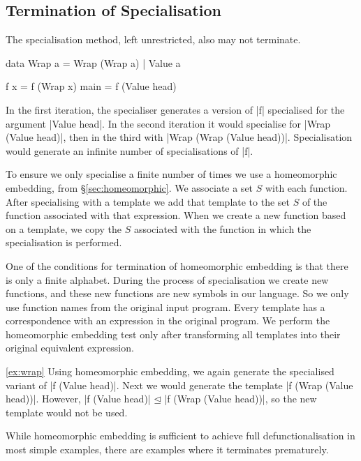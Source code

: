\subsection{Termination of Specialisation}
\label{sec:termination_specialisation}

The specialisation method, left unrestricted, also may not terminate.

\begin{example}
\label{ex:wrap}
\begin{code}
data Wrap a  =  Wrap (Wrap a)
             |  Value a

f x = f (Wrap x)
main = f (Value head)
\end{code}

In the first iteration, the specialiser generates a version of |f| specialised for the argument |Value head|. In the second iteration it would specialise for |Wrap (Value head)|, then in the third with |Wrap (Wrap (Value head))|. Specialisation would generate an infinite number of specialisations of |f|.
\end{example}

To ensure we only specialise a finite number of times we use a homeomorphic embedding, from \S\ref{sec:homeomorphic}. We associate a set $S$ with each function. After specialising with a template we add that template to the set $S$ of the function associated with that expression. When we create a new function based on a template, we copy the $S$ associated with the function in which the specialisation is performed.

One of the conditions for termination of homeomorphic embedding is that there is only a finite alphabet. During the process of specialisation we create new functions, and these new functions are new symbols in our language. So we only use function names from the original input program. Every template has a correspondence with an expression in the original program. We perform the homeomorphic embedding test only after transforming all templates into their original equivalent expression.

\begin{examplerevisit}{\ref{ex:wrap}}
Using homeomorphic embedding, we again generate the specialised variant of |f (Value head)|. Next we would generate the template |f (Wrap (Value head))|. However, |f (Value head)| $\unlhd{}$ |f (Wrap (Value head))|, so the new template would not be used.
\end{examplerevisit}

While homeomorphic embedding is sufficient to achieve full defunctionalisation in most simple examples, there are examples where it terminates prematurely.

